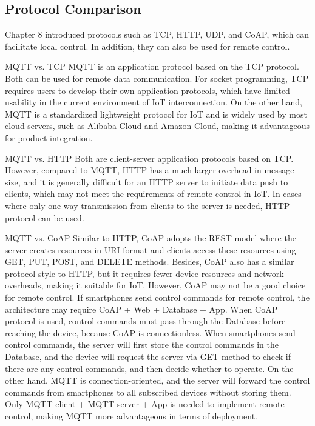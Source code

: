 \documentclass[a4paper,12pt]{book}
\begin{document}
\subsection{Protocol Comparison}
Chapter 8 introduced protocols such as TCP, HTTP, UDP, and CoAP, which can facilitate local control. In addition, they can also be used for remote control.

\begin{term}{MQTT vs. TCP}
    MQTT is an application protocol based on the TCP protocol. Both can be used for remote data communication. For socket programming, TCP requires users to develop their own application protocols, which have limited usability in the current environment of IoT interconnection. On the other hand, MQTT is a standardized lightweight protocol for IoT and is widely used by most cloud servers, such as Alibaba Cloud and Amazon Cloud, making it advantageous for product integration.
\end{term}

\begin{term}{MQTT vs. HTTP}
    Both are client-server application protocols based on TCP. However, compared to MQTT, HTTP has a much larger overhead in message size, and it is generally difficult for an HTTP server to initiate data push to clients, which may not meet the requirements of remote control in IoT. In cases where only one-way transmission from clients to the server is needed, HTTP protocol can be used.
\end{term}

\begin{term}{MQTT vs. CoAP}
    Similar to HTTP, CoAP adopts the REST model where the server creates resources in URI format and clients access these resources using GET, PUT, POST, and DELETE methods. Besides, CoAP also has a similar protocol style to HTTP, but it requires fewer device resources and network overheads, making it suitable for IoT. However, CoAP may not be a good choice for remote control. If smartphones send control commands for remote control, the architecture may require CoAP + Web + Database + App. When CoAP protocol is used, control commands must pass through the Database before reaching the device, because CoAP is connectionless. When smartphones send control commands, the server will first store the control commands in the Database, and the device will request the server via GET method to check if there are any control commands, and then decide whether to operate. On the other hand, MQTT is connection-oriented, and the server will forward the control commands from smartphones to all subscribed devices without storing them. Only MQTT client + MQTT server + App is needed to implement remote control, making MQTT more advantageous in terms of deployment.
\end{term}
\end{document}
